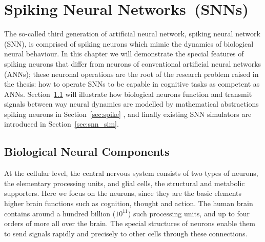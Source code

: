 \chapter{Spiking Neural Networks~(SNNs)}
\label{cha:bkg}
The so-called third generation of artificial neural network, \protect{} spiking neural network (SNN), is comprised of spiking neurons which mimic the dynamics of biological neural behaviour.
In this chapter we will demonstrate the special features of spiking neurons that differ from neurons of conventional artificial neural networks (ANNs);
these \protect{} \protect{} neuronal operations are the root of the research problem raised in the thesis: how to operate SNNs to be capable in cognitive tasks \protect{} as competent as ANNs.
Section~\ref{sec:bio_neuron} will illustrate how biological neurons function and transmit signals between \protect{} \protect{} way neural dynamics are modelled by mathematical abstractions \protect{} \protect{} spiking neurons \protect{} in Section~\ref{sec:spike} , and finally \protect{} existing SNN simulators are introduced in Section~\ref{sec:snn_sim}.

\section{Biological Neural Components}
\label{sec:bio_neuron}
At the cellular level, the central nervous system consists of two types of \protect{} \protect{} neurons, the elementary processing units, and glial cells, the structural and metabolic supporters. 
Here we focus on the neurons, since they are the basic elements \protect{} \protect{} higher brain functions such as cognition, thought and action. The human brain contains around a hundred billion ($10^{11}$) such processing units, and up to four orders of \protect{} \protect{} more \protect{} \protect{} all over the brain.
The special structures of neurons enable them to send signals rapidly and precisely to other cells through these connections.
